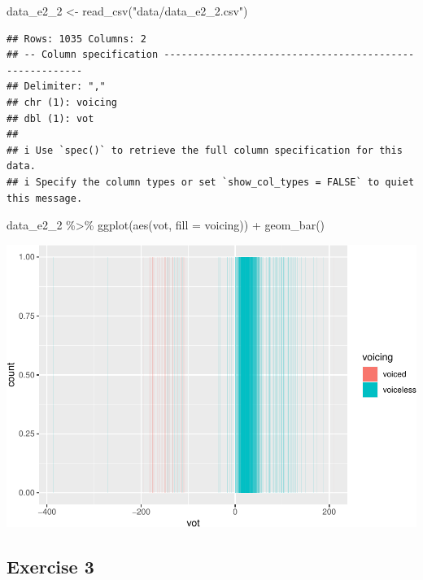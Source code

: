 \documentclass[
]{article}
\newenvironment{Shaded}{\begin{snugshade}}{\end{snugshade}}
\newcommand{\AttributeTok}[1]{\textcolor[rgb]{0.77,0.63,0.00}{#1}}
\newcommand{\FunctionTok}[1]{\textcolor[rgb]{0.00,0.00,0.00}{#1}}
\newcommand{\NormalTok}[1]{#1}
\newcommand{\OtherTok}[1]{\textcolor[rgb]{0.56,0.35,0.01}{#1}}
\newcommand{\SpecialCharTok}[1]{\textcolor[rgb]{0.00,0.00,0.00}{#1}}
\newcommand{\StringTok}[1]{\textcolor[rgb]{0.31,0.60,0.02}{#1}}
\begin{document}
\begin{Shaded}
\begin{Highlighting}[]
\NormalTok{data\_e2\_2 }\OtherTok{\textless{}{-}} \FunctionTok{read\_csv}\NormalTok{(}\StringTok{"data/data\_e2\_2.csv"}\NormalTok{)}
\end{Highlighting}
\end{Shaded}

\begin{verbatim}
## Rows: 1035 Columns: 2
## -- Column specification --------------------------------------------------------
## Delimiter: ","
## chr (1): voicing
## dbl (1): vot
## 
## i Use `spec()` to retrieve the full column specification for this data.
## i Specify the column types or set `show_col_types = FALSE` to quiet this message.
\end{verbatim}

\begin{Shaded}
\begin{Highlighting}[]
\NormalTok{data\_e2\_2 }\SpecialCharTok{\%\textgreater{}\%}
  \FunctionTok{ggplot}\NormalTok{(}\FunctionTok{aes}\NormalTok{(vot, }\AttributeTok{fill =}\NormalTok{ voicing)) }\SpecialCharTok{+}
  \FunctionTok{geom\_bar}\NormalTok{()}
\end{Highlighting}
\end{Shaded}

\includegraphics{analysis_files/figure-latex/e2-2-1.pdf}

\hypertarget{exercise-3}{%
\subsection{Exercise 3}\label{exercise-3}}
\end{document}

